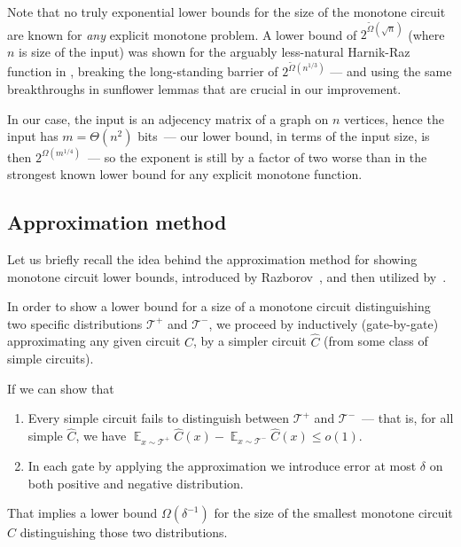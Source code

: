 \documentclass[10pt,a4paper]{article}
\DeclareMathOperator{\E}{\mathbb{E}}
\begin{document}
Note that no truly exponential lower bounds for the size of the monotone circuit are known for \emph{any} explicit monotone problem. A lower bound of $2^{\tilde\Omega(\sqrt{n})}$  (where $n$ is size of the input) was shown for the arguably less-natural Harnik-Raz function \cite{harnik00lower} in \cite{cavalar2022}, breaking the long-standing barrier of $2^{\tilde{\Omega}(n^{1/3})}$ --- and using the same breakthroughs in sunflower lemmas that are crucial in our improvement.

In our case, the input is an adjecency matrix of a graph on $n$ vertices, hence the input has $m = \Theta(n^2)$ bits~--- our lower bound, in terms of the input size, is then $2^{\Omega(m^{1/4})}$~--- so the exponent is still by a factor of two worse than in the strongest known lower bound for any explicit monotone function.
\subsection{Approximation method \label{sec:intro-approx-method}}
Let us briefly recall the idea behind the approximation method for showing monotone circuit lower bounds, introduced by Razborov~\cite{razborov1985lower}, and then utilized by~\cite{alon87,cavalar2022}.

In order to show a lower bound for a size of a monotone circuit distinguishing two specific distributions $\mathcal{T}^+$ and $\mathcal{T}^-$, we proceed by inductively (gate-by-gate) approximating any given circuit $C$, by a simpler circuit $\hat{C}$ (from some class of simple circuits).

If we can show that
\begin{enumerate}
    \item Every simple circuit fails to distinguish between $\mathcal{T}^+$ and $\mathcal{T}^-$~--- that is, for all simple $\hat{C}$, we have $\E_{x \sim \mathcal{T}^+}\hat{C}(x) - \E_{x\sim \mathcal{T}^-}\hat{C}(x) \leq o(1)$.
    \item In each gate by applying the approximation we introduce error at most $\delta$ on both positive and negative distribution.
\end{enumerate}
That implies a lower bound $\Omega(\delta^{-1})$ for the size of the smallest monotone circuit $C$ distinguishing those two distributions.
\end{document}
